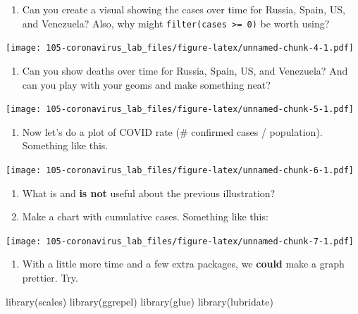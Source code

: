 \documentclass[
]{book}
\newenvironment{Shaded}{\begin{snugshade}}{\end{snugshade}}
\newcommand{\FunctionTok}[1]{\textcolor[rgb]{0.00,0.00,0.00}{#1}}
\newcommand{\NormalTok}[1]{#1}
\providecommand{\tightlist}{%
  \setlength{\itemsep}{0pt}\setlength{\parskip}{0pt}}
\begin{document}
\begin{enumerate}
\def\labelenumi{\arabic{enumi}.}
\tightlist
\item
  Can you create a visual showing the cases over time for Russia, Spain, US, and Venezuela?
  Also, why might \texttt{filter(cases\ \textgreater{}=\ 0)} be worth using?
\end{enumerate}

\texttt{[image: 105-coronavirus\_lab\_files/figure-latex/unnamed-chunk-4-1.pdf]}

\begin{enumerate}
\def\labelenumi{\arabic{enumi}.}
\setcounter{enumi}{1}
\tightlist
\item
  Can you show deaths over time for Russia, Spain, US, and Venezuela? And can you play with your geoms and make something neat?
\end{enumerate}

\texttt{[image: 105-coronavirus\_lab\_files/figure-latex/unnamed-chunk-5-1.pdf]}

\begin{enumerate}
\def\labelenumi{\arabic{enumi}.}
\setcounter{enumi}{2}
\tightlist
\item
  Now let's do a plot of COVID rate (\# confirmed cases / population). Something like this.
\end{enumerate}

\texttt{[image: 105-coronavirus\_lab\_files/figure-latex/unnamed-chunk-6-1.pdf]}

\begin{enumerate}
\def\labelenumi{\arabic{enumi}.}
\setcounter{enumi}{3}
\item
  What is and \textbf{is not} useful about the previous illustration?
\item
  Make a chart with cumulative cases. Something like this:
\end{enumerate}

\texttt{[image: 105-coronavirus\_lab\_files/figure-latex/unnamed-chunk-7-1.pdf]}

\begin{enumerate}
\def\labelenumi{\arabic{enumi}.}
\setcounter{enumi}{5}
\tightlist
\item
  With a little more time and a few extra packages, we \textbf{could} make a graph prettier. Try.
\end{enumerate}

\begin{Shaded}
\begin{Highlighting}[]
\FunctionTok{library}\NormalTok{(scales)}
\FunctionTok{library}\NormalTok{(ggrepel)}
\FunctionTok{library}\NormalTok{(glue)}
\FunctionTok{library}\NormalTok{(lubridate)}
\end{Highlighting}
\end{Shaded}
\end{document}

